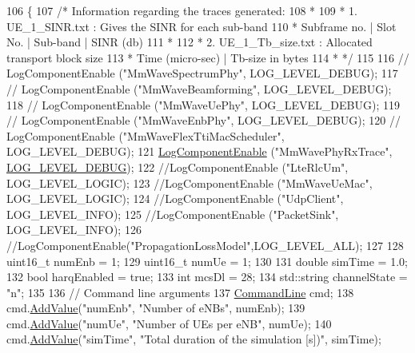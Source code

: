 \begin{DoxyCode}
106 \{
107   \textcolor{comment}{/* Information regarding the traces generated:}
108 \textcolor{comment}{   *}
109 \textcolor{comment}{   * 1. UE\_1\_SINR.txt : Gives the SINR for each sub-band}
110 \textcolor{comment}{   *    Subframe no.  | Slot No. | Sub-band  | SINR (db)}
111 \textcolor{comment}{   *}
112 \textcolor{comment}{   * 2. UE\_1\_Tb\_size.txt : Allocated transport block size}
113 \textcolor{comment}{   *    Time (micro-sec)  |  Tb-size in bytes}
114 \textcolor{comment}{   * */}
115 
116 \textcolor{comment}{//      LogComponentEnable ("MmWaveSpectrumPhy", LOG\_LEVEL\_DEBUG);}
117 \textcolor{comment}{//      LogComponentEnable ("MmWaveBeamforming", LOG\_LEVEL\_DEBUG);}
118 \textcolor{comment}{//      LogComponentEnable ("MmWaveUePhy", LOG\_LEVEL\_DEBUG);}
119 \textcolor{comment}{//      LogComponentEnable ("MmWaveEnbPhy", LOG\_LEVEL\_DEBUG);}
120 \textcolor{comment}{//      LogComponentEnable ("MmWaveFlexTtiMacScheduler", LOG\_LEVEL\_DEBUG);}
121         \hyperlink{namespacens3_adc4ef4f00bb2f5f4edae67fc3bc27f20}{LogComponentEnable} (\textcolor{stringliteral}{"MmWavePhyRxTrace"}, 
      \hyperlink{namespacens3_aa6464a4d69551a9cc968e17a65f39bdbabc85ae851e992c4d8577705c712061ef}{LOG\_LEVEL\_DEBUG});
122         \textcolor{comment}{//LogComponentEnable ("LteRlcUm", LOG\_LEVEL\_LOGIC);}
123         \textcolor{comment}{//LogComponentEnable ("MmWaveUeMac", LOG\_LEVEL\_LOGIC);}
124         \textcolor{comment}{//LogComponentEnable ("UdpClient", LOG\_LEVEL\_INFO);}
125         \textcolor{comment}{//LogComponentEnable ("PacketSink", LOG\_LEVEL\_INFO);}
126         \textcolor{comment}{//LogComponentEnable("PropagationLossModel",LOG\_LEVEL\_ALL);}
127 
128         uint16\_t numEnb = 1;
129         uint16\_t numUe = 1;
130 
131         \textcolor{keywordtype}{double} simTime = 1.0;
132         \textcolor{keywordtype}{bool} harqEnabled = \textcolor{keyword}{true};
133         \textcolor{keywordtype}{int} mcsDl = 28;
134         std::string channelState = \textcolor{stringliteral}{"n"};
135 
136         \textcolor{comment}{// Command line arguments}
137         \hyperlink{classns3_1_1CommandLine}{CommandLine} cmd;
138         cmd.\hyperlink{classns3_1_1CommandLine_addcfb546c7ad4c8bd0965654d55beb8e}{AddValue}(\textcolor{stringliteral}{"numEnb"}, \textcolor{stringliteral}{"Number of eNBs"}, numEnb);
139         cmd.\hyperlink{classns3_1_1CommandLine_addcfb546c7ad4c8bd0965654d55beb8e}{AddValue}(\textcolor{stringliteral}{"numUe"}, \textcolor{stringliteral}{"Number of UEs per eNB"}, numUe);
140         cmd.\hyperlink{classns3_1_1CommandLine_addcfb546c7ad4c8bd0965654d55beb8e}{AddValue}(\textcolor{stringliteral}{"simTime"}, \textcolor{stringliteral}{"Total duration of the simulation [s])"}, simTime);

\end{DoxyCode}
